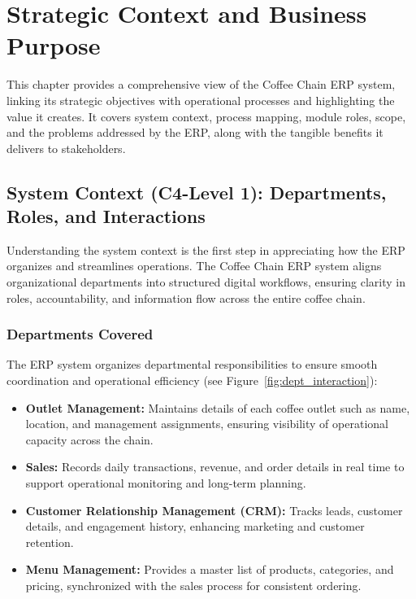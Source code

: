 \chapter{Strategic Context and Business Purpose}

This chapter provides a comprehensive view of the Coffee Chain ERP system, linking its strategic objectives with operational processes and highlighting the value it creates. It covers system context, process mapping, module roles, scope, and the problems addressed by the ERP, along with the tangible benefits it delivers to stakeholders.

\section{System Context (C4-Level 1): Departments, Roles, and Interactions}

Understanding the system context is the first step in appreciating how the ERP organizes and streamlines operations. The Coffee Chain ERP system aligns organizational departments into structured digital workflows, ensuring clarity in roles, accountability, and information flow across the entire coffee chain.

\subsection*{Departments Covered}
The ERP system organizes departmental responsibilities to ensure smooth coordination and operational efficiency (see Figure~\ref{fig:dept_interaction}):
\begin{itemize}
    \item \textbf{Outlet Management:} Maintains details of each coffee outlet such as name, location, and management assignments, ensuring visibility of operational capacity across the chain.
    \item \textbf{Sales:} Records daily transactions, revenue, and order details in real time to support operational monitoring and long-term planning.
    \item \textbf{Customer Relationship Management (CRM):} Tracks leads, customer details, and engagement history, enhancing marketing and customer retention.
    \item \textbf{Menu Management:} Provides a master list of products, categories, and pricing, synchronized with the sales process for consistent ordering.
\end{itemize}

